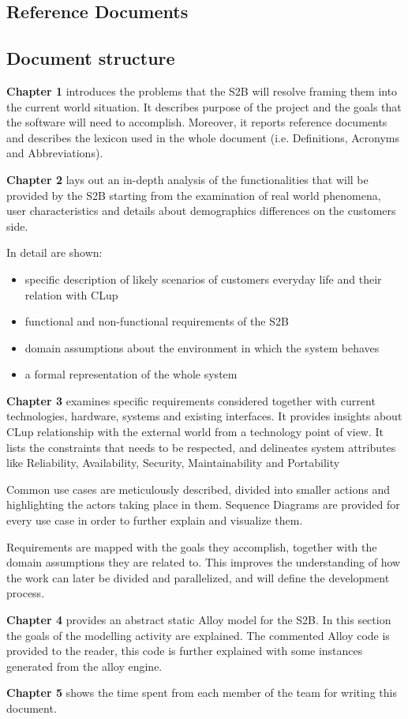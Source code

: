 \subsection{Reference Documents}
\subsection{Document structure}

\textbf{Chapter 1} introduces the problems that the S2B will resolve framing them into the current world situation. It describes purpose of the project and the goals that the software will need to accomplish. Moreover, it reports reference documents and describes the lexicon used in the whole document (i.e. Definitions, Acronyms and Abbreviations).

\textbf{Chapter 2} lays out an in-depth analysis of the functionalities that will be provided by the S2B starting from the examination of real world phenomena, user characteristics and details about demographics differences on the customers side.

In detail are shown:
\begin{itemize}
      \item specific description of likely scenarios of customers everyday life and their relation with CLup
      \item functional and non-functional requirements of the S2B
      \item domain assumptions about the environment in which the system behaves
      \item a formal representation of the whole system
\end{itemize}

\textbf{Chapter 3} examines specific requirements considered together with current technologies, hardware, systems and existing interfaces. It provides insights about CLup relationship with the external world from a technology point of view. It lists the constraints that needs to be respected, and delineates system attributes like Reliability, Availability, Security, Maintainability and Portability

Common use cases are meticulously described, divided into smaller actions and highlighting the actors taking place in them. Sequence Diagrams are provided for every use case in order to further explain and visualize them.

Requirements are mapped with the goals they accomplish, together with the domain assumptions they are related to. This improves the understanding of how the work can later be divided and parallelized, and will define the development process.


\textbf{Chapter 4} provides an abstract static Alloy model for the S2B. In this section the goals of the modelling activity are explained. The commented Alloy code is provided to the reader, this code is further explained with some instances generated from the alloy engine.

\textbf{Chapter 5} shows the time spent from each member of the team for writing this document. 